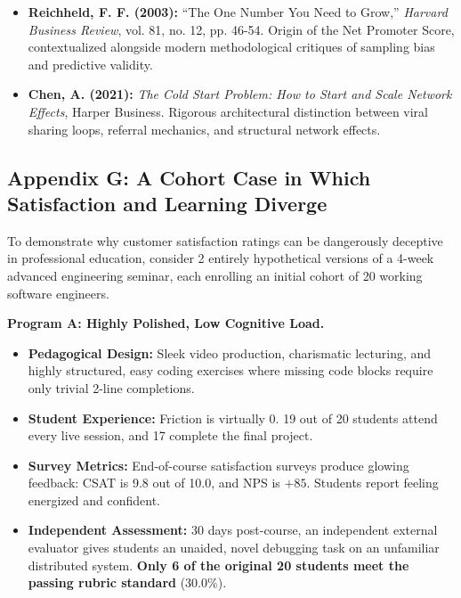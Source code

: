 \begin{itemize}[leftmargin=*]
\item \textbf{Reichheld, F. F. (2003):} ``The One Number You Need to Grow,'' \textit{Harvard Business Review}, vol. 81, no. 12, pp. 46-54. Origin of the Net Promoter Score, contextualized alongside modern methodological critiques of sampling bias and predictive validity.
\item \textbf{Chen, A. (2021):} \textit{The Cold Start Problem: How to Start and Scale Network Effects}, Harper Business. Rigorous architectural distinction between viral sharing loops, referral mechanics, and structural network effects.
\end{itemize}

\subsection*{Appendix G: A Cohort Case in Which Satisfaction and Learning Diverge}

To demonstrate why customer satisfaction ratings can be dangerously deceptive in professional education, consider 2 entirely hypothetical versions of a 4-week advanced engineering seminar, each enrolling an initial cohort of 20 working software engineers.

\textbf{Program A: Highly Polished, Low Cognitive Load.}
\begin{itemize}[leftmargin=*]
\item \textbf{Pedagogical Design:} Sleek video production, charismatic lecturing, and highly structured, easy coding exercises where missing code blocks require only trivial 2-line completions.
\item \textbf{Student Experience:} Friction is virtually 0. 19 out of 20 students attend every live session, and 17 complete the final project.
\item \textbf{Survey Metrics:} End-of-course satisfaction surveys produce glowing feedback: CSAT is 9.8 out of 10.0, and NPS is $+85$. Students report feeling energized and confident.
\item \textbf{Independent Assessment:} 30 days post-course, an independent external evaluator gives students an unaided, novel debugging task on an unfamiliar distributed system. \textbf{Only 6 of the original 20 students meet the passing rubric standard} ($30.0\%$).
\end{itemize}

